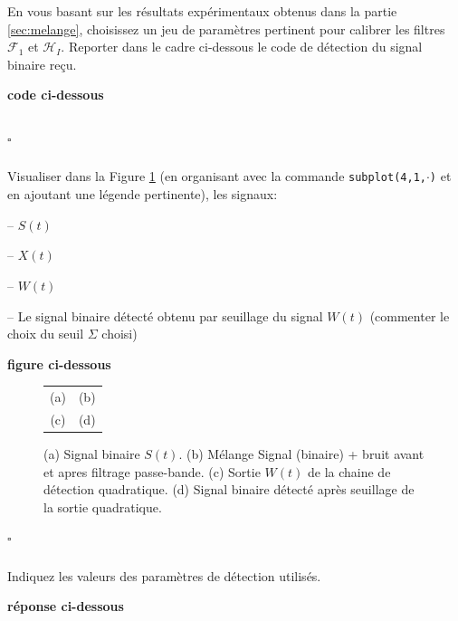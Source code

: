 \documentclass{article}
\newcommand{\debutrep}[1]{\color{blue}\begin{center} \hrulefill \textbf{ #1 } \hrulefill \end{center} }
\newcommand{\finrep}{\vspace*{5mm}\hfill $\square$\color{black}\vspace*{5mm}}
\begin{document}
En vous basant sur les résultats expérimentaux obtenus dans la partie \ref{sec:melange}, choisissez un jeu de paramètres pertinent pour calibrer les filtres 
$\mathcal{F}_1$ et $\mathcal{H}_I$. Reporter dans le cadre ci-dessous le code  de détection du signal binaire reçu. 

\debutrep{code ci-dessous}
\begin{verbatim}

\end{verbatim}
\finrep

\subsubsection{}

Visualiser dans la Figure \ref{fig-binaire}  (en organisant avec la commande {\tt subplot(4,1,$\cdot$)} et en ajoutant une légende pertinente), les signaux:\\[-3mm]
\begin{list}{-}{\setlength{\leftmargin}{3mm} \setlength{\labelwidth}{20mm} \setlength{\labelsep}{2mm} \setlength{\itemsep}{1mm} }
\item[--] $S(t)$
\item[--] $X(t)$
\item[--] $W(t)$
\item[--] Le signal binaire détecté obtenu par seuillage du signal $W(t)$ (commenter le choix du seuil $\Sigma$ choisi)
\end{list} 

\debutrep{figure ci-dessous}
\begin{figure}
\begin{tabular}{cc}
(a) & (b) \\
(c) & (d) \\
\end{tabular}
\caption{(a) Signal binaire $S(t)$. (b) Mélange Signal (binaire) + bruit avant et apres filtrage passe-bande. (c) Sortie $W(t)$ de la chaine de détection quadratique. (d) Signal binaire détecté après seuillage de la sortie quadratique.}
\label{fig-binaire}
\end{figure}
\finrep


\subsubsection{}

Indiquez les valeurs des paramètres de détection utilisés.

\debutrep{réponse ci-dessous}
\end{document}
